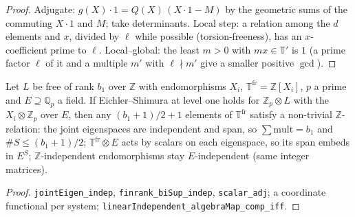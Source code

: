 \begin{proof}
  \leanok
  Adjugate: $g(X)\cdot1=Q(X)\,(X\cdot1-M)$ by the geometric sums of the commuting $X\cdot1$ and $M$; take determinants. Local step: a
  relation among the $d$ elements and $x$, divided by $\ell$ while possible (torsion-freeness), has an $x$-coefficient prime to $\ell$.
  Local--global: the least $m>0$ with $mx\in\mathbb T'$ is $1$ (a prime factor $\ell$ of it and a multiple $m'$ with $\ell\nmid m'$ give a
  smaller positive $\gcd$).
\end{proof}

\begin{lemma}\label{inf:heckez-rank}
  \leanok
  Let $L$ be free of rank $b_1$ over $\mathbb Z$ with endomorphisms $X_i$, $\mathbb T^{\mathrm{fr}}=\mathbb Z[X_i]$, $p$ a prime and $E\supseteq\mathbb Q_p$
  a field. If Eichler--Shimura at level one holds for $\mathbb Z_p\otimes L$ with the $X_i\otimes\mathbb Z_p$ over $E$, then any
  $(b_1+1)/2+1$ elements of $\mathbb T^{\mathrm{fr}}$ satisfy a non-trivial $\mathbb Z$-relation: the joint eigenspaces are independent and
  span, so $\sum\mathrm{mult}=b_1$ and $\#S\le(b_1+1)/2$; $\mathbb T^{\mathrm{fr}}\otimes E$ acts by scalars on each eigenspace, so its span embeds
  in $E^S$; $\mathbb Z$-independent endomorphisms stay $E$-independent (same integer matrices).
\end{lemma}
\begin{proof}
  \leanok
  \texttt{jointEigen\_indep}, \texttt{finrank\_biSup\_indep}, \texttt{scalar\_adj}; a coordinate functional per system;
  \texttt{linearIndependent\_algebraMap\_comp\_iff}.
\end{proof}

